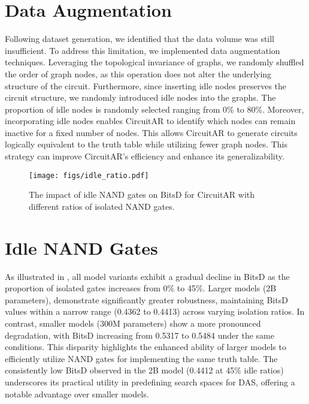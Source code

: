 \section{Data Augmentation}
\label{appendix:dataaug}

Following dataset generation, we identified that the data volume was still insufficient. 
To address this limitation, we implemented data augmentation techniques. 
Leveraging the topological invariance of graphs, we randomly shuffled the order of graph nodes, as this operation does not alter the underlying structure of the circuit. 
Furthermore, since inserting idle nodes preserves the circuit structure, we randomly introduced idle nodes into the graphs. 
The proportion of idle nodes is randomly selected ranging from 0\% to 80\%.
Moreover, incorporating idle nodes enables CircuitAR to identify which nodes can remain inactive for a fixed number of nodes. 
This allows CircuitAR to generate circuits logically equivalent to the truth table while utilizing fewer graph nodes. 
This strategy can improve CircuitAR's efficiency and enhance its generalizability.

\begin{figure}[]
    \centering
    \texttt{[image: figs/idle\_ratio.pdf]} 
    \caption{The impact of idle NAND gates on BitsD for CircuitAR with different ratios of isolated NAND gates.}
    \label{fig:idle_gates}
\end{figure}

\section{Idle NAND Gates}
\label{appendix:idlenand}

As illustrated in , all model variants exhibit a gradual decline in BitsD as the proportion of isolated gates increases from 0\% to 45\%. 
Larger models (2B parameters), demonstrate significantly greater robustness, maintaining BitsD values within a narrow range (0.4362 to 0.4413) across varying isolation ratios. 
In contrast, smaller models (300M parameters) show a more pronounced degradation, with BitsD increasing from 0.5317 to 0.5484 under the same conditions. 
This disparity highlights the enhanced ability of larger models to efficiently utilize NAND gates for implementing the same truth table. 
The consistently low BitsD observed in the 2B model (0.4412 at 45\% idle ratios) underscores its practical utility in predefining search spaces for DAS, offering a notable advantage over smaller models.